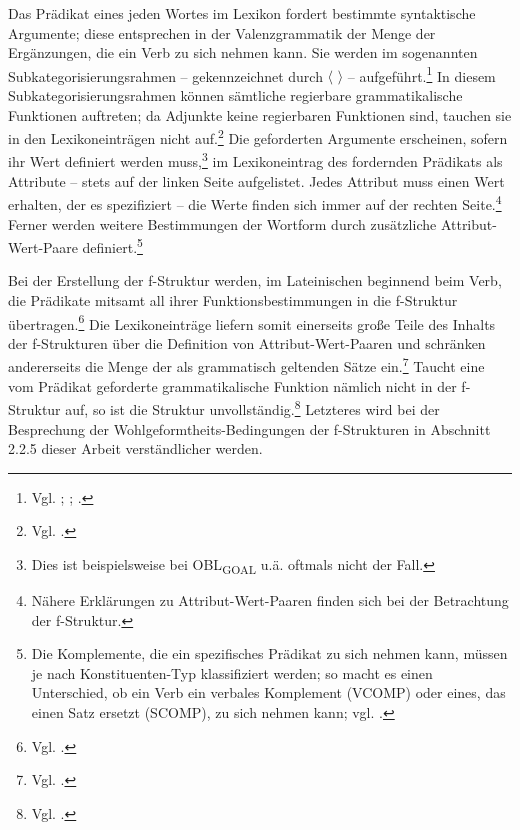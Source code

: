 \documentclass[12pt,a4paper]{article}
\begin{document}
Das Prädikat eines jeden Wortes im Lexikon fordert bestimmte syntaktische Argumente; diese entsprechen in der Valenzgrammatik der Menge der Ergänzungen, die ein Verb zu sich nehmen kann. Sie werden im sogenannten Subkategorisierungsrahmen -- gekennzeichnet durch $\langle$ $\rangle$ -- aufgeführt.\footnote{Vgl. \cite[7]{Dal}; \cite[70]{Skript}; \cite[27]{Rohrer}.} In diesem Subkategorisierungsrahmen können sämtliche regierbare grammatikalische Funktionen auftreten; da Adjunkte keine regierbaren Funktionen sind, tauchen sie in den Lexikoneinträgen nicht auf.\footnote{Vgl. \cite[27]{Rohrer}.} Die geforderten Argumente erscheinen, sofern ihr Wert definiert werden muss,\footnote{Dies ist beispielsweise bei OBL\textsubscript{GOAL} u.ä. oftmals nicht der Fall.} im Lexikoneintrag des fordernden Prädikats als Attribute -- stets auf der linken Seite aufgelistet. Jedes Attribut muss einen Wert erhalten, der es spezifiziert -- die Werte finden sich immer auf der rechten Seite.\footnote{Nähere Erklärungen zu Attribut-Wert-Paaren finden sich bei der Betrachtung der f-Struktur.} Ferner werden weitere Bestimmungen der Wortform durch zusätzliche Attribut-Wert-Paare definiert.\footnote{Die Komplemente, die ein spezifisches Prädikat zu sich nehmen kann, müssen je nach Konstituenten-Typ klassifiziert werden; so macht es einen Unterschied, ob ein Verb ein verbales Komplement (VCOMP) oder eines, das einen Satz ersetzt (SCOMP), zu sich nehmen kann; vgl. \cite[22]{Rohrer}.}

Bei der Erstellung der f-Struktur werden, im Lateinischen beginnend beim Verb, die Prädikate mitsamt all ihrer Funktionsbestimmungen in die f-Struktur übertragen.\footnote{Vgl. \cite[28]{Rohrer}.} Die Lexikoneinträge liefern somit einerseits große Teile des Inhalts der f-Strukturen über die Definition von Attribut-Wert-Paaren und schränken andererseits die Menge der als grammatisch geltenden Sätze ein.\footnote{Vgl. \cite[63]{Skript}.}  Taucht eine vom Prädikat geforderte grammatikalische Funktion nämlich nicht in der f-Struktur auf, so ist die Struktur unvollständig.\footnote{Vgl. \cite[28]{Rohrer}.} Letzteres wird bei der Besprechung der Wohlgeformtheits-Bedingungen der f-Strukturen in Abschnitt 2.2.5 dieser Arbeit verständlicher werden.
\end{document}
